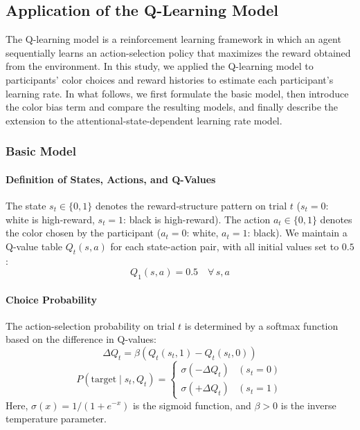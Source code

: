 \documentclass[dvipdfmx]{article}
\begin{document}
\subsection{Application of the Q-Learning Model}
The Q-learning model is a reinforcement learning framework in which an agent sequentially learns an action-selection policy that maximizes the reward obtained from the environment.
In this study, we applied the Q-learning model to participants' color choices and reward histories to estimate each participant's learning rate.
In what follows, we first formulate the basic model, then introduce the color bias term and compare the resulting models, and finally describe the extension to the attentional-state-dependent learning rate model.


\subsubsection{Basic Model}

\paragraph{Definition of States, Actions, and Q-Values}
The state $s_t \in \{0, 1\}$ denotes the reward-structure pattern on trial $t$
($s_t = 0$: white is high-reward, $s_t = 1$: black is high-reward).
The action $a_t \in \{0, 1\}$ denotes the color chosen by the participant
($a_t = 0$: white, $a_t = 1$: black).
We maintain a Q-value table $Q_t(s, a)$ for each state-action pair, with all initial values set to $0.5$:
\begin{equation}
    Q_1(s, a) = 0.5 \quad \forall\, s, a
\end{equation}

\paragraph{Choice Probability}
The action-selection probability on trial $t$ is determined by a softmax function based on the difference in Q-values:
\begin{equation}
    \Delta Q_t = \beta \left( Q_t(s_t, 1) - Q_t(s_t, 0) \right)
\end{equation}
\begin{equation}
    P(\text{target} \mid s_t, Q_t) =
    \begin{cases}
        \sigma(-\Delta Q_t) & (s_t = 0) \\
        \sigma(+\Delta Q_t) & (s_t = 1)
    \end{cases}
\end{equation}
Here, $\sigma(x) = 1/(1 + e^{-x})$ is the sigmoid function, and $\beta > 0$ is the inverse temperature parameter.
\end{document}
